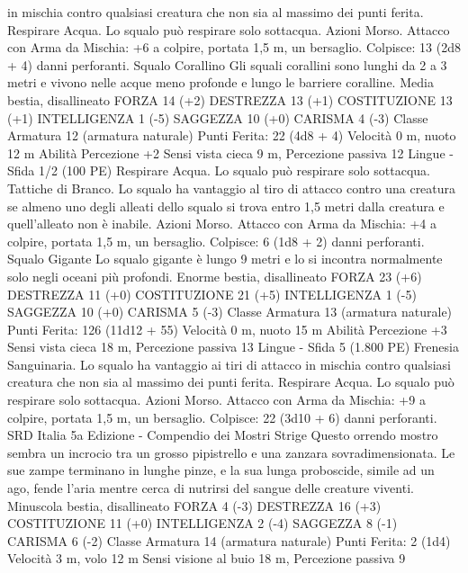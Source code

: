 \begin{multicols}{2}
in mischia contro qualsiasi creatura che non sia al massimo dei
punti ferita.
Respirare Acqua. Lo squalo può respirare solo sottacqua.
Azioni
Morso. Attacco con Arma da Mischia: +6 a colpire, portata 1,5
m, un bersaglio.
Colpisce: 13 (2d8 + 4) danni perforanti.
Squalo Corallino
Gli squali corallini sono lunghi da 2 a 3 metri e vivono
nelle acque meno profonde e lungo le barriere coralline.
Media bestia, disallineato
FORZA 14 (+2)
DESTREZZA 13 (+1)
COSTITUZIONE 13 (+1)
INTELLIGENZA 1 (-5)
SAGGEZZA 10 (+0)
CARISMA 4 (-3)
Classe Armatura 12 (armatura naturale)
\hspace*{0pt}\hfill{Punti Ferita}: 22 (4d8 + 4)
Velocità 0 m, nuoto 12 m
Abilità Percezione +2
Sensi vista cieca 9 m, Percezione passiva 12
Lingue -
Sfida 1/2 (100 PE)
Respirare Acqua. Lo squalo può respirare solo sottacqua.
Tattiche di Branco. Lo squalo ha vantaggio al tiro di attacco
contro una creatura se almeno uno degli alleati dello squalo si
trova entro 1,5 metri dalla creatura e quell’alleato non è inabile.
Azioni
Morso. Attacco con Arma da Mischia: +4 a colpire, portata 1,5
m, un bersaglio.
Colpisce: 6 (1d8 + 2) danni perforanti.
Squalo Gigante
Lo squalo gigante è lungo 9 metri e lo si incontra
normalmente solo negli oceani più profondi.
Enorme bestia, disallineato
FORZA 23 (+6)
DESTREZZA 11 (+0)
COSTITUZIONE 21 (+5)
INTELLIGENZA 1 (-5)
SAGGEZZA 10 (+0)
CARISMA 5 (-3)
Classe Armatura 13 (armatura naturale)
\hspace*{0pt}\hfill{Punti Ferita}: 126 (11d12 + 55)
Velocità 0 m, nuoto 15 m
Abilità Percezione +3
Sensi vista cieca 18 m, Percezione passiva 13
Lingue -
Sfida 5 (1.800 PE)
Frenesia Sanguinaria. Lo squalo ha vantaggio ai tiri di attacco
in mischia contro qualsiasi creatura che non sia al massimo dei
punti ferita.
Respirare Acqua. Lo squalo può respirare solo sottacqua.
Azioni
Morso. Attacco con Arma da Mischia: +9 a colpire, portata 1,5
m, un bersaglio.
Colpisce: 22 (3d10 + 6) danni perforanti.
SRD Italia 5a Edizione - Compendio dei Mostri
Strige
Questo orrendo mostro sembra un incrocio tra un
grosso pipistrello e una zanzara sovradimensionata. Le
sue zampe terminano in lunghe pinze, e la sua lunga
proboscide, simile ad un ago, fende l’aria mentre cerca
di nutrirsi del sangue delle creature viventi.
Minuscola bestia, disallineato
FORZA 4 (-3)
DESTREZZA 16 (+3)
COSTITUZIONE 11 (+0)
INTELLIGENZA 2 (-4)
SAGGEZZA 8 (-1)
CARISMA 6 (-2)
Classe Armatura 14 (armatura naturale)
\hspace*{0pt}\hfill{Punti Ferita}: 2 (1d4)
Velocità 3 m, volo 12 m
Sensi visione al buio 18 m, Percezione passiva 9

\end{multicols}
